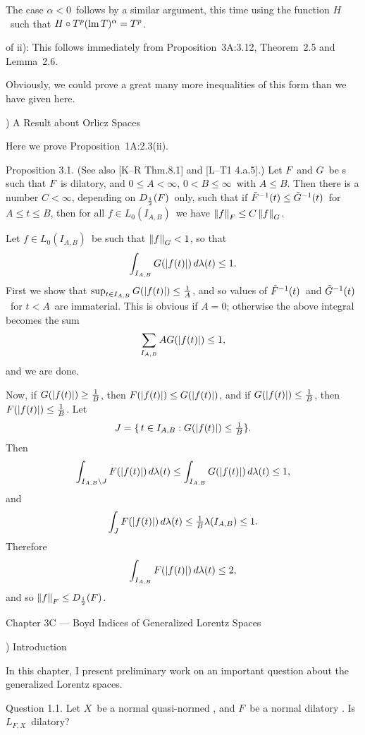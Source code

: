 The case $\alpha<0$\ follows by a similar argument, this time using
the
function $H$\ such that $H\circ T^p(\mathop{\rm lm}\nolimits T)^\alpha = T^p$.
\endproof
 
\proof of ii): This follows immediately from Proposition~3A:3.12,
Theorem~2.5 and
Lemma~2.6.
\endproof
 
Obviously, we could prove a great many more inequalities of this
form than we
have given here.
 
\vfill
\eject
 
) A Result about Orlicz Spaces
 
Here we prove Proposition~1A:2.3(ii).
 
\proclaim Proposition 3.1. (See also [K--R Thm.8.1] and [L--T1 4.a.5].)
Let $F$\ and $G$\ be \af s such that $F$\ is
dilatory, and $0\le A<\infty$, $0<B\le\infty$\ with $A\le B$. Then
there is a
number $C<\infty$, depending on $D_{1\over2}(F)$\ only, such that if
$\tilde F^{-1}(t) \le
\tilde G^{-1}(t)$\ for $A\le t\le B$, then for all $f\in L_0(I_{A,B})$\
we have
$\left\| f \right\|_F \le C \left\| f \right\|_G$.
 
\Proof
Let $f\in L_0(I_{A,B})$\ be such that $\left\| f \right\|_G <1$, so that
$$ \int_{I_{A,B}} G(\left| f(t)\right|) \,d\lambda(t) \le 1.$$
First we show that $\sup_{t\in I_{A,B}} G(\left| f(t)\right|) \le {1\over
A}$, and so
values of $\tilde F^{-1}(t)$\ and $\tilde G^{-1}(t)$\ for $t<A$\ are immaterial.
This is
obvious if $A=0$; otherwise the above integral becomes the sum
$$ \sum_{I_{A,B}} A G(\left| f(t)\right|) \le 1 ,$$
and we are done.
 
Now, if $G(\left| f(t)\right|) \ge {1\over B}$, then $F(\left| f(t)\right|) \le
G(\left| f(t)\right|)$, and if $G(\left| f(t)\right|) \le {1\over B}$, then $F(\left| f(t)\right|)
\le {1\over B}$. Let
$$ J = \{\, t\in I_{A,B} : G(\left| f(t)\right|) \le {\textstyle{1\over B}} \}.$$
Then
$$ \int_{I_{A,B}\setminus J} F(\left| f(t)\right|) \,d\lambda(t)
   \le \int_{I_{A,B}} G(\left| f(t)\right|) \,d\lambda(t)
   \le 1, $$
and
$$ \int_J F(\left| f(t)\right|) \,d\lambda(t) \le {\textstyle{1\over B}} \lambda(I_{A,B})
   \le 1.$$
Therefore
$$ \int_{I_{A,B}} F(\left| f(t)\right|) \,d\lambda(t) \le 2,$$
and so $\left\| f \right\|_F \le D_{1\over2}(F)$.
\endproof
 
\vfill
\eject
 
\beginsection Chapter 3C --- Boyd Indices of Generalized Lorentz
Spaces
 
) Introduction
 
In this chapter, I present preliminary work on an important question
about the generalized Lorentz spaces.
 
\proclaim Question 1.1. Let $X$\ be a normal quasi-normed \ris\onIzi,
and
$F$\ be a normal dilatory \af. Is $L_{F,X}$\ dilatory?
 
